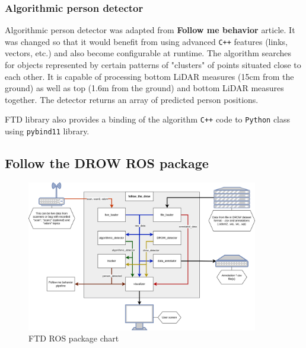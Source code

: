 \documentclass{article}
\begin{document}
\subsubsection{Algorithmic person detector}

Algorithmic person detector was adapted from \textbf{Follow me behavior} \cite{follow_me_behavior} article.
It was changed so that it would benefit from using advanced \texttt{C++} features (links, vectors, etc.) and also become configurable at runtime.
The algorithm searches for objects represented by certain patterns of "clusters" of points situated close to each other.
It is capable of processing bottom LiDAR measures (15cm from the ground) as well as top (1.6m from the ground) and bottom LiDAR measures together.
The detector returns an array of predicted person positions.

FTD library also provides a binding of the algorithm \texttt{C++} code to \texttt{Python} class using \texttt{pybind11}\cite{pybind_site} library.

\subsection{Follow the DROW ROS package}

\begin{figure}[t!]
	\centering
	\includegraphics[width=0.9\textwidth]{ftd_package_chart}
	\caption{FTD ROS package chart}
	\label{fig:ftd_package_chart}
\end{figure}
\end{document}
